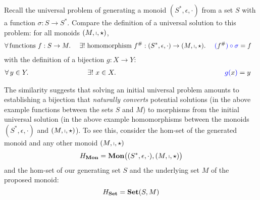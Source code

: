 \begin{remark}
    Recall the universal problem of generating a monoid 
    $(S^\ast, \epsilon, \cdot)$ from a set $S$ with a function 
    $\sigma: S\to S^\ast$. Compare the definition of a universal solution to
    this problem: for all monoids $(M, \shortmid, \star)$,
    \begin{alignat*}{3}
        & \forall\, \text{functions } f:S\to M.\ &&
        \exists!\ \text{homomorphism } 
        f^\#: (S^\ast, \epsilon, \cdot)
        \to 
        (M, \shortmid, \star)
        .\ &&
        \textcolor{blue}{(}f^\#\textcolor{blue}{) \circ \sigma} = f
    \end{alignat*}
    with the definition of a bijection $g : X \rightarrow Y$:
    \begin{alignat*}{3}
        & 
        \forall\, y \in Y.\ 
        \hspace*{2.5cm} 
        &&
        \exists!\ x \in X.\ 
        \hspace*{5cm} 
        &&
        \textcolor{blue}{g(}x\textcolor{blue}{)} = y
    \end{alignat*}

    The similarity suggests that solving an initial universal problem amounts
    to establishing a bijection that \emph{naturally converts} potential
    solutions (in the above example functions between the sets $S$ and $M$) to
    morphisms from the initial universal solution \big(in the above example
    homomorphisms between the monoids $(S^\ast, \epsilon, \cdot)$ and 
    $(M, \shortmid, \star)$\big).
    To see this, consider the hom-set of the generated monoid and any other
    monoid $(M, \shortmid, \star)$
    \begin{equation*}
        H_{\mathbf {Mon}} 
        = \mathbf {Mon} \big( (S^*, \epsilon, \cdot), (M, \shortmid, \star) \big)
    \end{equation*}
    and the hom-set of our generating set $S$ and the underlying set $M$ of
    the proposed monoid:
    \begin{equation*}
        H_{\mathbf {Set}} = \mathbf {Set} ( S, M )
    \end{equation*}


\end{remark}
